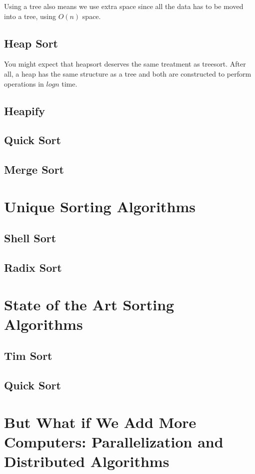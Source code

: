 Using a tree also means we use extra space since all the data has to be moved into a tree, using $ O(n) $ space.
\subsection{Heap Sort}
You might expect that heapsort deserves the same treatment as treesort.
After all, a heap has the same structure as a tree and both are constructed to perform operations in $log n $ time.

\subsection{Heapify}

\subsection{Quick Sort}
\subsection{Merge Sort}



\section{Unique Sorting Algorithms}


\subsection{Shell Sort}

\subsection{Radix Sort}


\section{State of the Art Sorting Algorithms}

\subsection{Tim Sort}
\subsection{Quick Sort}
\section{But What if We Add More Computers: Parallelization and Distributed Algorithms}

